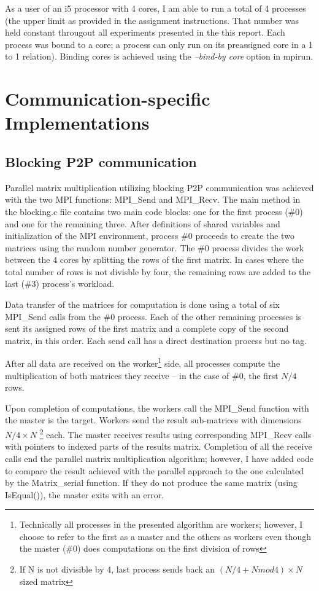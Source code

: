 \documentclass[12pt]{report}
\begin{document}
As a user of an i5 processor with 4 cores, I am able to run a total of 4 processes (the upper limit as provided in the assignment instructions. That number was held constant througout all experiments presented in the this report. Each process was bound to a core; a process can only run on its preassigned core in a 1 to 1 relation). Binding cores is achieved using the \emph{--bind-by core} option in mpirun.



\chapter{Communication-specific Implementations}
\section{Blocking P2P communication}

Parallel matrix multiplication utilizing blocking P2P communication was achieved with the two MPI functions: MPI\_Send and MPI\_Recv. The main method in the blocking.c file contains two main code blocks: one for the first process (\#0) and one for the remaining three. After definitions of shared variables and initialization of the MPI environment, process \#0 proceeds to create the two matrices using the random number generator. The \#0 process divides the work between the 4 cores by splitting the rows of the first matrix. In cases where the total number of rows is not divisble by four, the remaining rows are added to the last (\#3) process's workload.

Data transfer of the matrices for computation is done using a total of six MPI\_Send calls from the \#0 process. Each of the other remaining processes is sent its assigned rows of the first matrix and a complete copy of the second matrix, in this order. Each send call has a direct destination process but no tag. 

After all data are received on the worker\footnote{\label{^2}Technically all processes in the presented algorithm are workers; however, I choose to refer to the first as a master and the others as workers even though the master (\#0) does computations on the first division of rows} side, all processes compute the multiplication of both matrices they receive -- in the case of \#0, the first $N/4$ rows.

Upon completion of computations, the workers call the MPI\_Send function with the master is the target. Workers send the result sub-matrices with dimensions $N/4 \times N$ \footnote{\label{^3}If N is not divisible by 4, last process sends back an $(N/4 + N mod 4) \times N$ sized matrix} each. The master receives results using corresponding MPI\_Recv calls with pointers to indexed parts of the results matrix. Completion of all the receive calls end the parallel matrix multiplication algorithm; however, I have added code to compare the result achieved with the parallel approach to the one calculated by the Matrix\_serial function. If they do not produce the same matrix (using IsEqual()), the master exits with an error.
\end{document}
